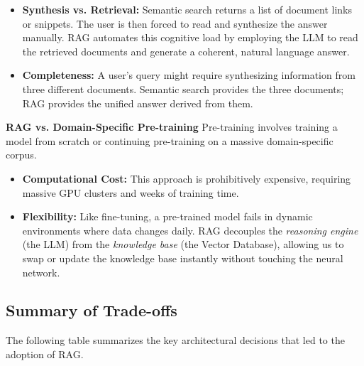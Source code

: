 \begin{itemize}
    \item \textbf{Synthesis vs. Retrieval:} Semantic search returns a list of document links or snippets. The user is then forced to read and synthesize the answer manually. RAG automates this cognitive load by employing the LLM to read the retrieved documents and generate a coherent, natural language answer.
    \item \textbf{Completeness:} A user's query might require synthesizing information from three different documents. Semantic search provides the three documents; RAG provides the unified answer derived from them.
\end{itemize}

\textbf{RAG vs. Domain-Specific Pre-training}
Pre-training involves training a model from scratch or continuing pre-training on a massive domain-specific corpus.

\begin{itemize}
    \item \textbf{Computational Cost:} This approach is prohibitively expensive, requiring massive GPU clusters and weeks of training time.
    \item \textbf{Flexibility:} Like fine-tuning, a pre-trained model fails in dynamic environments where data changes daily. RAG decouples the \textit{reasoning engine} (the LLM) from the \textit{knowledge base} (the Vector Database), allowing us to swap or update the knowledge base instantly without touching the neural network.
\end{itemize}

\subsection{Summary of Trade-offs}

The following table summarizes the key architectural decisions that led to the adoption of RAG.

